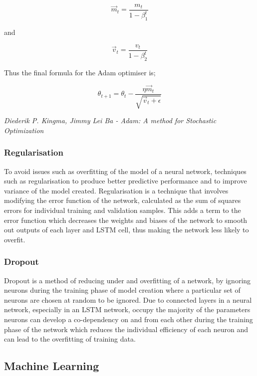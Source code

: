 \documentclass[oneside, 12pt]{article}
\begin{document}
\begin{itemize}
				\[ \vec{m}_t = \frac{m_t}{1 - \beta^t_1} \] 
				\begin{center}
					and
				\end{center}				
				\[\vec{v}_t = \frac{v_t}{1 - \beta^t_2} \]
				
				Thus the final formula for the Adam optimiser is;
				
				\[\theta_{t+1} = \theta_t - \frac{\eta \vec{m}_t}{\sqrt{\vec{v}_t + \epsilon}} \]
				
				\begin{center}
					\textit{Diederik P. Kingma, Jimmy Lei Ba - Adam: A method for Stochastic Optimization}\cite{Adam}
				\end{center}
			\end{itemize}
		
		\subsubsection{Regularisation}
		To avoid issues such as overfitting of the model of a neural network, techniques such as regularisation to produce better predictive performance and to improve variance of the model created. \cite{RegularisationSc} Regularisation is a technique that involves modifying the error function of the network, calculated as the sum of squares errors for individual training and validation samples. This adds a term to the error function which decreases the weights and biases of the network to smooth out outputs of each layer and LSTM cell, thus making the network less likely to overfit. 
		
		\subsubsection{Dropout}
		Dropout is a method of reducing under and overfitting of a network, by ignoring neurons during the training phase of model creation where a particular set of neurons are chosen at random to be ignored. Due to connected layers in a neural network, especially in an LSTM network, occupy the majority of the parameters neurons can develop a co-dependency on and from each other during the training phase of the network which reduces the individual efficiency of each neuron and can lead to the overfitting of training data. \cite{dropoutKeras}\cite{dropoutM}
		
		\subsection{Machine Learning}\label{machine}
\end{document}
